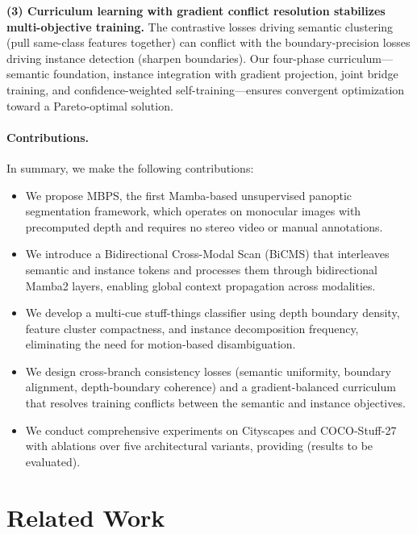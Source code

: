 \documentclass{article}
\begin{document}
\textbf{(3) Curriculum learning with gradient conflict resolution stabilizes multi-objective training.} The contrastive losses driving semantic clustering (pull same-class features together) can conflict with the boundary-precision losses driving instance detection (sharpen boundaries). Our four-phase curriculum---semantic foundation, instance integration with gradient projection, joint bridge training, and confidence-weighted self-training---ensures convergent optimization toward a Pareto-optimal solution.

\paragraph{Contributions.} In summary, we make the following contributions:
\begin{itemize}
    \item We propose MBPS, the first Mamba-based unsupervised panoptic segmentation framework, which operates on monocular images with precomputed depth and requires no stereo video or manual annotations.
    \item We introduce a Bidirectional Cross-Modal Scan (BiCMS) that interleaves semantic and instance tokens and processes them through bidirectional Mamba2 layers, enabling global context propagation across modalities.
    \item We develop a multi-cue stuff-things classifier using depth boundary density, feature cluster compactness, and instance decomposition frequency, eliminating the need for motion-based disambiguation.
    \item We design cross-branch consistency losses (semantic uniformity, boundary alignment, depth-boundary coherence) and a gradient-balanced curriculum that resolves training conflicts between the semantic and instance objectives.
    \item We conduct comprehensive experiments on Cityscapes and COCO-Stuff-27 with ablations over five architectural variants, providing \underline{\hspace{2em}} (results to be evaluated).
\end{itemize}


\section{Related Work}
\label{sec:related}
\end{document}
